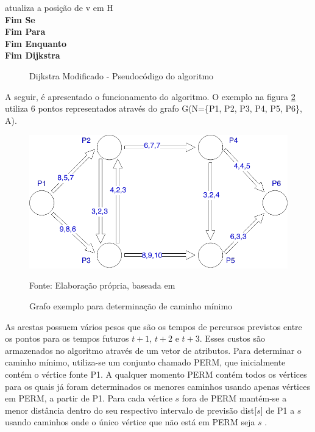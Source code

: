 {\begin{minipage}{70ex}
\vspace*{-1mm} \phantom{} \hspace{12ex} atualiza a posição de v em H\\
\vspace*{-1mm} \phantom{} \hspace{9ex} {\bf Fim Se}\\
\vspace*{-1mm} \phantom{} \hspace{6ex} {\bf Fim Para}\\
\vspace*{-1mm} \phantom{} \hspace{3ex} {\bf Fim Enquanto}\\
\vspace*{-1mm} \phantom{} \hspace{0ex} {\bf Fim Dijkstra}\\
\end{minipage}}
\begin{figure}[htbp]
\centering
\caption{Dijkstra Modificado - Pseudocódigo do algoritmo}
\label{fig:diMod}
\end{figure}
\FloatBarrier

A seguir, é apresentado o funcionamento do algoritmo. O exemplo na figura \ref{fig:leo1} utiliza
6 pontos representados através do grafo G(N=\{P1, P2, P3, P4, P5, P6\}, A).

\begin{figure}[htbp]
\centering
 \includegraphics[width=.60\textwidth]{chapters/fig/leo1.png}
\caption{Grafo exemplo para determinação de caminho mínimo}
Fonte: Elaboração própria, baseada em \cite{leonard}
\label{fig:leo1}
\end{figure}

As arestas possuem vários pesos que são os tempos de percursos previstos entre os pontos para os tempos
futuros $t + 1$, $t + 2$ e $t + 3$. Esses custos são armazenados no algoritmo através de um vetor de atributos.
Para determinar o caminho mínimo, utiliza-se um conjunto chamado PERM, que inicialmente contém o vértice fonte P1.
A qualquer momento PERM contém todos os vértices para os quais já foram determinados os menores caminhos usando
apenas vértices em PERM, a partir de P1. Para cada vértice $s$ fora de PERM mantém-se a menor distância dentro do
seu respectivo intervalo de previsão dist[$s$] de P1 a $s$ usando caminhos onde o único vértice que não está em
PERM seja $s$ \cite{leonard}.

